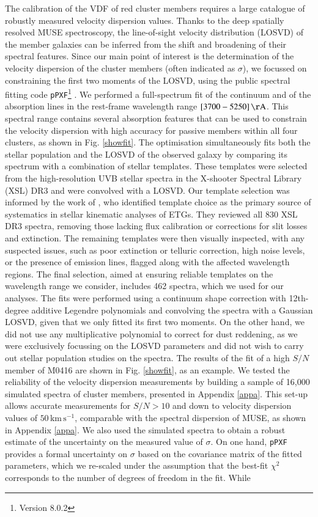 \documentclass{aa}
\begin{document}
The calibration of the VDF of red cluster members requires a large catalogue of robustly measured velocity dispersion values. Thanks to the deep spatially resolved MUSE spectroscopy, the line-of-sight velocity distribution (LOSVD) of the member galaxies can be inferred from the shift and broadening of their spectral features. Since our main point of interest is the determination of the velocity dispersion of the cluster members (often indicated as $\sigma$), we focussed on constraining the first two moments of the LOSVD, using the public spectral fitting code \texttt{pPXF}\footnote{Version 8.0.2} \citep[penalised pixel fitting][]{cappellari04,cappellari17,cappellari23}. We performed a full-spectrum fit of the continuum and of the absorption lines in the rest-frame wavelength range $[3700-5250]\, \rm \AA$. This spectral range contains several absorption features that can be used to constrain the velocity dispersion with high accuracy for passive members within all four clusters, as shown in Fig. \ref{showfit}. The optimisation simultaneously fits both the stellar population and the LOSVD of the observed galaxy by comparing its spectrum with a combination of stellar templates. These templates were selected from the high-resolution UVB stellar spectra in the X-shooter Spectral Library (XSL) DR3 \citep{verro22} and were convolved with a LOSVD. Our template selection was informed by the work of \cite{knabel25}, who identified template choice as the primary source of systematics in stellar kinematic analyses of ETGs. They reviewed all 830 XSL DR3 spectra, removing those lacking flux calibration or corrections for slit losses and extinction. The remaining templates were then visually inspected, with any suspected issues, such as poor extinction or telluric correction, high noise levels, or the presence of emission lines, flagged along with the affected wavelength regions. The final selection, aimed at ensuring reliable templates on the wavelength range we consider, includes 462 spectra, which we used for our analyses. The fits were performed using a continuum shape correction with 12th-degree additive Legendre polynomials and convolving the spectra with a Gaussian LOSVD, given that we only fitted its first two moments. On the other hand, we did not use any multiplicative polynomial to correct for dust reddening, as we were exclusively focussing on the LOSVD parameters and did not wish to carry out stellar population studies on the spectra. The results of the fit of a high $S/N$ member of M0416 are shown in Fig. \ref{showfit}, as an example. We tested the reliability of the velocity dispersion measurements by building a sample of 16,000 simulated spectra of cluster members, presented in Appendix \ref{appa}. This set-up allows accurate measurements for $S/N>10$ and down to velocity dispersion values of $50 \, \mathrm{km \, s^{-1}}$, comparable with the spectral dispersion of MUSE, as shown in Appendix \ref{appa}. We also used the simulated spectra to obtain a robust estimate of the uncertainty on the measured value of $\sigma$. On one hand, \texttt{pPXF} provides a formal uncertainty on $\sigma$ based on the covariance matrix of the fitted parameters, which we re-scaled under the assumption that the best-fit $\chi^2$ corresponds to the number of degrees of freedom in the fit. While 
\end{document}
